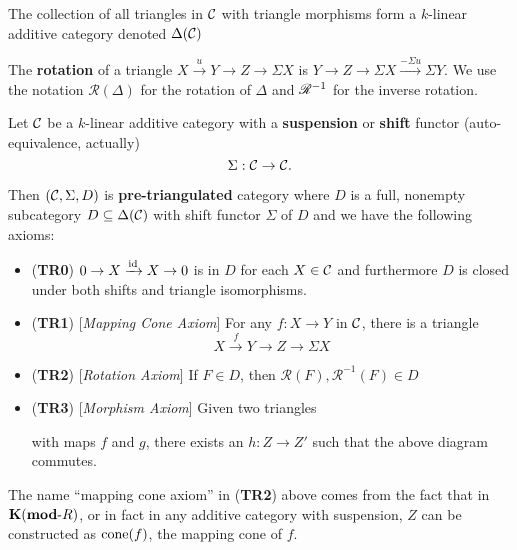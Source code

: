 \documentclass[12pt]{article}
\begin{document}
\begin{lem}
	The collection of all triangles in $\cal C$ with triangle morphisms form a $k$-linear additive category denoted $\Delta(\cal C)$
\end{lem}

\begin{defn}
	The \textbf{rotation} of a triangle $X\xrightarrow{u} Y\to Z\to \Sigma X$ is $Y\to Z\to \Sigma X\xrightarrow{-\Sigma u}\Sigma Y.$
	We use the notation $\mathscr R(\Delta)$ for the rotation of $\Delta$ and $\mathscr{R}^{-1}$ for the inverse rotation.
\end{defn}

\begin{defn}
	Let $\cal C$ be a $k$-linear additive category with a \textbf{suspension} or \textbf{shift} functor (auto-equivalence, actually)
	\[\Sigma:\cal C\to\cal C.\]

	Then $({\mathcal{C}}, \Sigma ,D)$ is \textbf{pre-triangulated} category where $D$ is a full, nonempty subcategory $D\subseteq\Delta(\cal C)$
	with shift functor $\Sigma$ of $D$ and we have the following axioms:
	\begin{itemize}
		\item (\textbf{TR0}) $0\to X\xrightarrow{\operatorname{id}} X\to 0$ is in $D$ for each $X\in \cal C$ and furthermore $D$ is closed under both shifts and triangle isomorphisms.
		\item (\textbf{TR1}) [\textit{Mapping Cone Axiom}] For any $f:X\to Y$ in $\cal C$, there is a triangle
		\[X\xrightarrow{f} Y\to Z\to\Sigma X\]
		\item (\textbf{TR2}) [\textit{Rotation Axiom}] If $F\in D$, then $\mathscr R(F),\mathscr R^{-1}(F)\in D$
		\item (\textbf{TR3}) [\textit{Morphism Axiom}] Given two triangles 
		\begin{center}
		\end{center}
		with maps $f$ and $g$, there exists an $h:Z\to Z'$ such that the above diagram commutes.
	\end{itemize}
\end{defn}
\begin{rmk}
	The name ``mapping cone axiom'' in (\textbf{TR2}) above comes from the fact that in $\mathbf{K}(\mathbf{mod}\text{-}R)$, or in fact in 
	any additive category with suspension, $Z$ can be constructed as $\operatorname{cone}(f)$, the mapping cone of $f$. 
\end{rmk}
\end{document}
